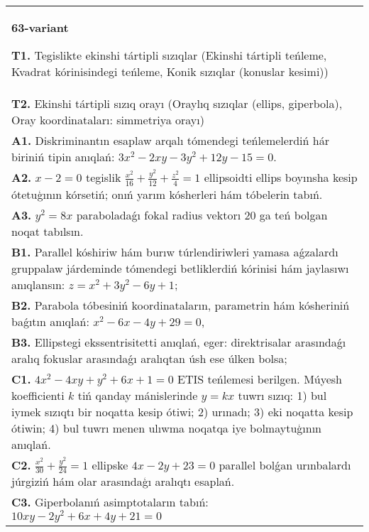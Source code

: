 \documentclass{article}
\begin{document}
\begin{tabular}{m{17cm}}
\textbf{63-variant}
\newline

\textbf{T1.} Tegislikte ekinshi tártipli sızıqlar (Ekinshi tártipli teńleme, Kvadrat kórinisindegi teńleme, Konik sızıqlar (konuslar kesimi)) \\
\textbf{T2.} Ekinshi tártipli sızıq orayı (Oraylıq sızıqlar (ellips, giperbola), Oray koordinataları: simmetriya orayı) \\
\textbf{A1.} Diskriminantın esaplaw arqalı tómendegi teńlemelerdiń hár biriniń tipin anıqlań: $3 x^2-2 x y-3 y^2+12 y-15=0$. \\
\textbf{A2.} $x-2=0$ tegislik $\frac{x^2}{16}+\frac{y^2}{12}+\frac{z^2}{4}=1$ ellipsoidti ellips boyınsha kesip ótetuģının kórsetiń; onıń yarım kósherleri hám tóbelerin tabıń. \\
\textbf{A3.} $y^2=8 x$ paraboladaǵı fokal radius vektorı 20 ga teń bolgan noqat tabılsın. \\
\textbf{B1.} Parallel kóshiriw hám burıw túrlendiriwleri yamasa aǵzalardı gruppalaw járdeminde tómendegi betliklerdiń kórinisi hám jaylasıwı anıqlansın: $z=x^2+3 y^2-6 y+1$; \\
\textbf{B2.} Parabola tóbesiniń koordinataların, parametrin hám kósheriniń baǵıtın anıqlań: $x^2-6 x-4 y+29=0$, \\
\textbf{B3.} Ellipstegi ekssentrisitetti anıqlań, eger: direktrisalar arasındaǵı aralıq fokuslar arasındaǵı aralıqtan úsh ese úlken bolsa; \\
\textbf{C1.} $4 x^2-4 x y+y^2+6 x+1=0$ ETIS teńlemesi berilgen. Múyesh koefficienti $k$ tiń qanday mánislerinde $y=kx$ tuwrı sızıq: 1) bul iymek sızıqtı bir noqatta kesip ótiwi; 2) urınadı; 3) eki noqatta kesip ótiwin; 4) bul tuwrı menen ulıwma noqatqa iye bolmaytuģının anıqlań. \\
\textbf{C2.} $\frac{x^2}{30}+\frac{y^2}{24}=1$ ellipske $4x-2y+23=0$ parallel bolǵan urınbalardı júrgiziń hám olar arasındaģı aralıqtı esaplań. \\
\textbf{C3.} Giperbolanıń asimptotaların tabıń: $10 x y-2 y^2+6 x+4 y+21=0$ \\

\end{tabular}
\vspace{1cm}
\end{document}
